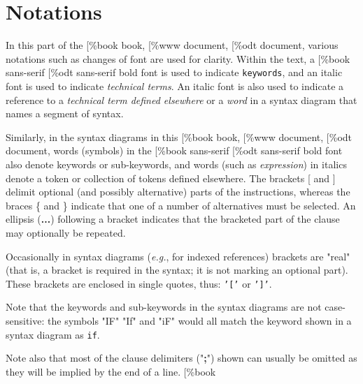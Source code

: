 \chapter{Notations}\label{"id"}
 
In this part of the
[\%book
book,
[\%www
document,
[\%odt
document,
various notations such as changes of font are used for clarity.
Within the text, a
[\%book
sans-serif
[\%odt
sans-serif
bold font is used to indicate \texttt{keywords}, and an italic
font is used to indicate \emph{technical terms}.
An italic font is also used to indicate a reference to a
\emph{technical term defined elsewhere} or a \emph{word} in a
syntax diagram that names a segment of syntax.
 
Similarly, in the syntax diagrams in this
[\%book
book,
[\%www
document,
[\%odt
document,
words (symbols) in the
[\%book
sans-serif
[\%odt
sans-serif
bold font also denote keywords or
sub-keywords, and words (such as \emph{expression}) in italics
denote a token or collection of tokens defined elsewhere.
The brackets [ and ] delimit optional (and possibly
alternative) parts of the instructions, whereas the braces \{
and \} indicate that one of a number of alternatives must be
selected.
An ellipsis (\textbf{...}) following a bracket indicates that
the bracketed part of the clause may optionally be repeated.
 
Occasionally in syntax diagrams (\emph{e.g.}, for indexed references)
brackets are "real" (that is, a bracket is required in the
syntax; it is not marking an optional part).
These brackets are enclosed in single quotes, thus:
\texttt{'['} or \texttt{']'}.
 
Note that the keywords and sub-keywords in the syntax diagrams are not
case-sensitive: the symbols "IF" "If" and "iF" would
all match the keyword shown in a syntax diagram as \texttt{if}.
 
Note also that most of the clause delimiters ("\textbf{;}") shown
can usually be omitted as they will be implied by the end of a line.
[\%book
